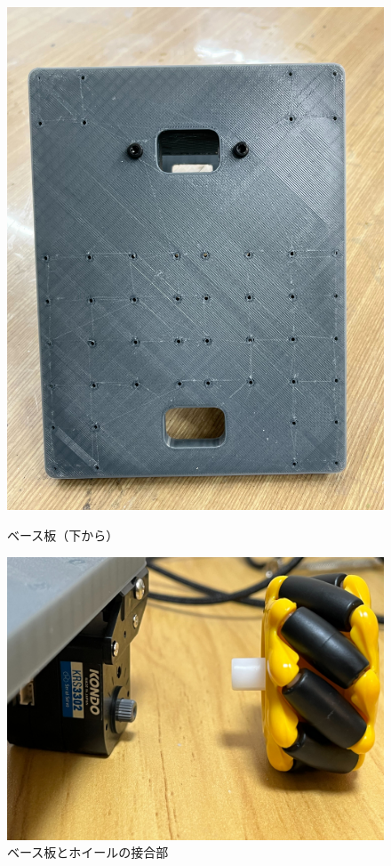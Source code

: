 \documentclass[10pt, oneside, titlepage]{ltjarticle}  %
\begin{document}
  \begin{figure}[H]
    \centering
    \begin{minipage}{0.48\textwidth}
      \centering
      \includegraphics[width=\textwidth]{figures/body3.jpg}
      \caption{ベース板（下から）}
      \label{body3}
    \end{minipage}
    \hfill
    \begin{minipage}{0.48\textwidth}
      \centering
      \includegraphics[width=\textwidth]{figures/body4.jpg}
      \caption{ベース板とホイールの接合部}
      \label{body4}
    \end{minipage}
  \end{figure}
\end{document}
